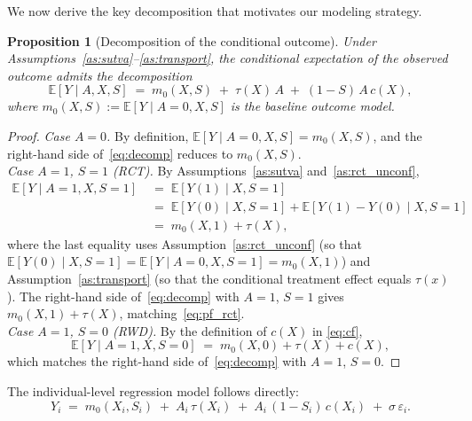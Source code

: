 \documentclass[11pt]{article}
\theoremstyle{plain}
\theoremstyle{definition}
\theoremstyle{remark}
\newcommand{\E}{\mathbb{E}}
\newcommand{\1}{\mathds{1}}
\theoremstyle{plain}
\newtheorem{proposition}{Proposition}
\theoremstyle{remark}
\newcommand{\CATE}{\tau}
\newcommand{\cf}{c}
\begin{document}
We now derive the key decomposition that motivates our modeling strategy.

\begin{proposition}[Decomposition of the conditional outcome]\label{prop:decomp}
  Under Assumptions~\ref{as:sutva}--\ref{as:transport}, the conditional expectation of the observed outcome admits the decomposition
  \begin{equation}\label{eq:decomp}
    \E[Y \mid A, X, S] \;=\; m_0(X, S) \;+\; \CATE(X)\,A \;+\; (1 - S)\,A\,\cf(X),
  \end{equation}
  where $m_0(X, S) := \E[Y \mid A = 0, X, S]$ is the baseline outcome model.
\end{proposition}

\begin{proof}
  \emph{Case $A=0$.} By definition, $\E[Y \mid A{=}0, X, S] = m_0(X, S)$, and the right-hand side of~\eqref{eq:decomp} reduces to $m_0(X,S)$. \\[6pt]
  \emph{Case $A=1$, $S=1$ (RCT).} By Assumptions~\ref{as:sutva} and~\ref{as:rct_unconf},
  \begin{align}
    \E[Y \mid A{=}1, X, S{=}1] &\;=\; \E[Y(1) \mid X, S{=}1] \nonumber\\
    &\;=\; \E[Y(0) \mid X, S{=}1] + \E[Y(1) - Y(0) \mid X, S{=}1] \nonumber\\
    &\;=\; m_0(X, 1) + \CATE(X), \label{eq:pf_rct}
  \end{align}
  where the last equality uses Assumption~\ref{as:rct_unconf} (so that $\E[Y(0) \mid X, S{=}1] = \E[Y \mid A{=}0, X, S{=}1] = m_0(X,1)$) and Assumption~\ref{as:transport} (so that the conditional treatment effect equals $\CATE(x)$). The right-hand side of~\eqref{eq:decomp} with $A=1$, $S=1$ gives $m_0(X,1) + \CATE(X)$, matching~\eqref{eq:pf_rct}.\\[6pt]
  \emph{Case $A=1$, $S=0$ (RWD).} By the definition of $\cf(X)$ in \eqref{eq:cf},
  \begin{equation*}
    \E[Y \mid A{=}1, X, S{=}0] \;=\; m_0(X, 0) + \CATE(X) + \cf(X),
  \end{equation*}
  which matches the right-hand side of~\eqref{eq:decomp} with $A=1$, $S=0$.
\end{proof}

\noindent The individual-level regression model follows directly:
\begin{equation}\label{eq:individual}
  Y_i \;=\; m_0(X_i, S_i) \;+\; A_i\,\CATE(X_i) \;+\; A_i\,(1 - S_i)\,\cf(X_i) \;+\; \sigma\,\varepsilon_i.
\end{equation}
\end{document}
